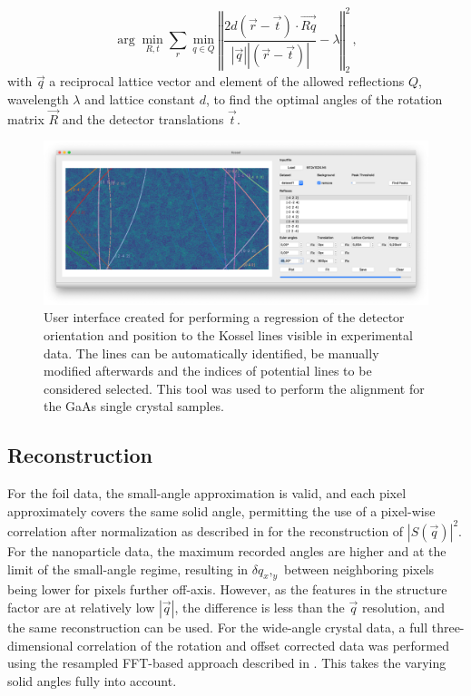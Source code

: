 \begin{equation}
	\arg\!\min_{R,t} \sum_{r} \min_{q\in Q} \left\Vert \frac{2 d  \left( \vec{r} - \vec{t} \right) \cdot \vec{Rq}}{\left|\vec{q}\right| \left| \left(\vec{r}-\vec{t}\right)\right|} -\lambda \right\Vert_2^2 \,,
\end{equation}
with
$\vec{q}$ a reciprocal lattice vector and element of the allowed reflections $Q$, wavelength $\lambda$ and lattice constant $d$, to find
 the optimal angles of the rotation matrix $\vec{R}$ and the detector translations $\vec{t}$.
 


\begin{figure}
	\centering
	\includegraphics[width=0.8\linewidth]{images/kosselfit.png}
	\caption[User Interface for Kossel line based alignment]{User interface created for performing a regression of the detector orientation and position to the Kossel lines visible in experimental data. The lines can be automatically identified,  be  manually modified afterwards and the indices of potential lines to be considered selected. This tool was used to perform the alignment for the GaAs single crystal samples.}
	\label{fig:kosselfit}
\end{figure}





\subsection{Reconstruction}
For the foil data, the small-angle approximation is valid, and each pixel approximately covers the same solid angle, permitting the use of a pixel-wise correlation after normalization as described in  for the reconstruction of $|S(\vec{q})|^2$. For the nanoparticle data, the maximum recorded angles are higher and at the limit of the small-angle regime, resulting in $\delta q_x,_y$ between neighboring pixels being lower for pixels further off-axis. However, as the features in the structure factor are at relatively low $\left|\vec{q}\right|$, the difference is less than the $\vec{q}$ resolution, and the same reconstruction can be used.
For the wide-angle crystal data, a full three-dimensional correlation of the rotation and offset corrected data was performed using the resampled FFT-based approach described in . This takes the varying solid angles fully into account.


